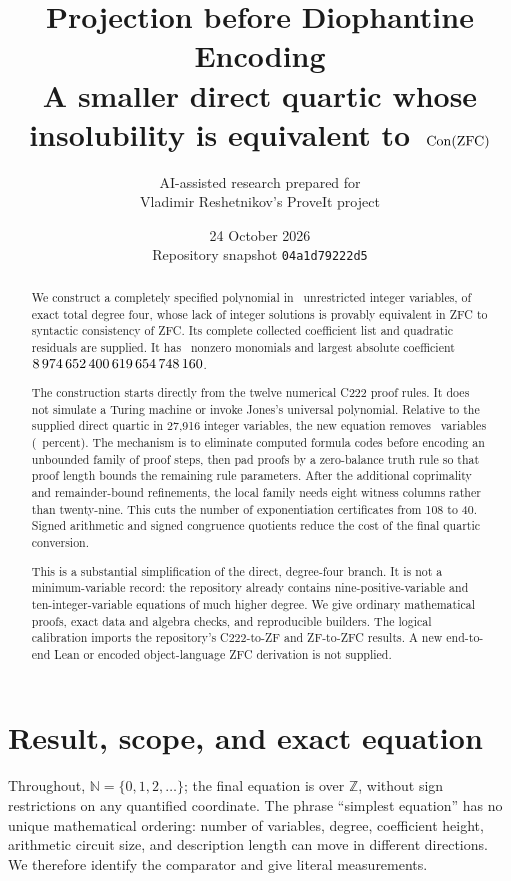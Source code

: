 \documentclass[11pt,a4paper]{article}
\title{\vspace{-10mm}\textbf{Projection before Diophantine Encoding}\\[2mm]
\large A smaller direct quartic whose insolubility is equivalent to\ \(\operatorname{Con}(\mathrm{ZFC})\)}
\author{AI-assisted research prepared for\\Vladimir Reshetnikov's ProveIt project}
\date{24 October 2026\\\small Repository snapshot \texttt{04a1d79222d5}}
\theoremstyle{definition}\newtheorem{definition}[theorem]{Definition}
\theoremstyle{remark}\newtheorem{remark}[theorem]{Remark}
\newcommand{\N}{\mathbb N}\newcommand{\Z}{\mathbb Z}\newcommand{\Q}{\mathbb Q}
\numberwithin{equation}{section}
\begin{document}
\maketitle
\begin{abstract}
We construct a completely specified polynomial in \FinalVars\ unrestricted
integer variables, of exact total degree four, whose lack of integer
solutions is provably equivalent in ZFC to syntactic consistency of ZFC.
Its complete collected coefficient list and quadratic residuals are supplied.
It has \FinalTerms\ nonzero monomials and largest absolute coefficient
\(8\,974\,652\,400\,619\,654\,748\,160\).

The construction starts directly from the twelve numerical C222 proof
rules. It does not simulate a Turing machine or invoke Jones's universal
polynomial. Relative to the supplied direct quartic in 27,916 integer
variables, the new equation removes \SavedVars\ variables
(\ReductionPercent\ percent). The mechanism is to eliminate computed
formula codes before encoding an unbounded family of proof steps, then
pad proofs by a zero-balance truth rule so that proof length bounds the
remaining rule parameters. After the additional coprimality and remainder-bound refinements, the
local family needs eight witness columns rather than twenty-nine. This
cuts the number of exponentiation certificates from 108 to 40. Signed arithmetic and signed
congruence quotients reduce the cost of the final quartic conversion.

This is a substantial simplification of the direct, degree-four branch.
It is not a minimum-variable record: the repository already contains
nine-positive-variable and ten-integer-variable equations of much higher
degree. We give ordinary mathematical proofs, exact data and algebra
checks, and reproducible builders. The logical calibration imports the
repository's C222-to-ZF and ZF-to-ZFC results. A new end-to-end Lean or
encoded object-language ZFC derivation is not supplied.
\end{abstract}
\clearpage
\begingroup\small\setlength{\parskip}{0pt}\tableofcontents\endgroup
\clearpage

\section{Result, scope, and exact equation}

Throughout, \(\N=\{0,1,2,\ldots\}\); the final equation is over
\(\Z\), without sign restrictions on any quantified coordinate.
The phrase ``simplest equation'' has no unique mathematical ordering:
number of variables, degree, coefficient height, arithmetic circuit size,
and description length can move in different directions. We therefore
identify the comparator and give literal measurements.
\end{document}
